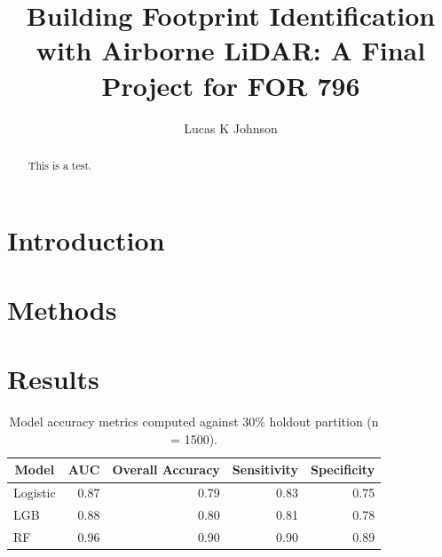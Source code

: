 \documentclass[]{elsarticle} %
\begin{document}
\begin{frontmatter}

  \title{Building Footprint Identification with Airborne LiDAR: A Final Project for FOR 796}
    \author[]{Lucas K Johnson}
  
      
  \begin{abstract}
  This is a test.
  \end{abstract}
  
 \end{frontmatter}

\hypertarget{introduction}{%
\section{Introduction}\label{introduction}}

\hypertarget{methods}{%
\section{Methods}\label{methods}}

\hypertarget{results}{%
\section{Results}\label{results}}

\begin{table}

\caption{\label{tab:metrics}Model accuracy metrics computed against 30\% holdout partition (n = 1500).}
\centering
\fontsize{12}{14}\selectfont
\begin{tabular}[t]{lrrrr}
\toprule
\multicolumn{1}{c}{Model} & \multicolumn{1}{c}{AUC} & \multicolumn{1}{c}{Overall Accuracy} & \multicolumn{1}{c}{Sensitivity} & \multicolumn{1}{c}{Specificity}\\
\midrule
Logistic & 0.87 & 0.79 & 0.83 & 0.75\\
\addlinespace
LGB & 0.88 & 0.80 & 0.81 & 0.78\\
\addlinespace
RF & 0.96 & 0.90 & 0.90 & 0.89\\
\bottomrule
\end{tabular}
\end{table}
\end{document}
